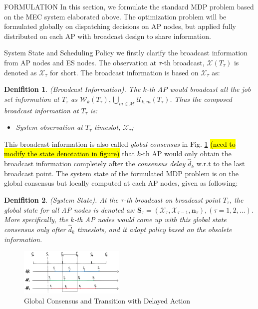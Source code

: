 \documentclass[10pt, conference, letterpaper]{IEEEtran}
\newtheorem{definition}{Denifition}
\renewcommand{\vec}{\mathbf}
\newcommand{\esSet}{\mathcal{M}}
\newcommand{\wSet}{\mathcal{W}}
\newcommand{\uSet}{\mathcal{U}}
\newcommand{\Stat}{\mathbf{S}}
\newcommand{\Obsv}{\mathcal{X}}
\begin{document}
    \begin{section}{FORMULATION}
        \label{sec:formulation}
        In this section, we formulate the standard MDP problem based on the MEC system elaborated above. The optimization problem will be formulated globally on dispatching decisions on AP nodes, but applied fully distributed on each AP with broadcast design to share information.

        \begin{subsection}{System State and Scheduling Policy}
            we firstly clarify the broadcast information from AP nodes and ES nodes.
            The observation at $\tau$-th broadcast, $\Obsv(T_\tau)$ is denoted as $\Obsv_\tau$ for short. The broadcast information is based on $\Obsv_\tau$ as:
            \begin{definition}(Broadcast Information).
                The $k$-th AP would broadcast all the job set information at $T_\tau$ as $\wSet_{k}(T_\tau), \bigcup\limits_{m\in\esSet}\uSet_{k,m}(T_\tau)$.
                Thus the composed broadcast information at $T_\tau$ is:
                \begin{itemize}
                    \item System observation at $T_\tau$ timeslot, $\Obsv_\tau$;
                \end{itemize}
            \end{definition}

            This broadcast information is also called \emph{global consensus} in Fig. \ref{fig:br-trans} \hl{(need to modify the state denotation in figure)} that $k$-th AP would only obtain the broadcast information completely after the \emph{consensus delay} $\hat{d}_{k}$ w.r.t to the last broadcast point. The system state of the formulated MDP problem is on the global consensus but locally computed at each AP nodes, given as following:
            \begin{definition}(System State).
                At the $\tau$-th broadcast on broadcast point $T_\tau$, the global state for all AP nodes is denoted as: $\Stat_\tau = (\Obsv_{\tau}, \Obsv_{\tau-1}, \vec{n}_\tau), (\tau=1,2,\dots)$.
                More specifically, the $k$-th AP nodes would come up with this global state consensus only after $\hat{d}_k$ timeslots, and it adopt policy based on the obsolete information.
            \end{definition}
            \begin{figure}[ht]
                \centering
                \includegraphics[width=0.45\textwidth]{broadcast-trans.png}
                \caption{Global Consensus and Transition with Delayed Action}
                \label{fig:br-trans}
            \end{figure}


\end{subsection}
\end{section}
\end{document}
